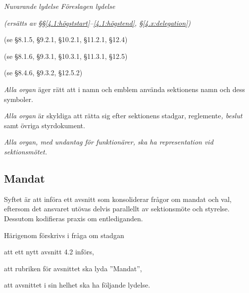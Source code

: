 \documentclass{article}
\newenvironment{lydelse}
    {\begin{paracol}{2}%
        \emph{Nuvarande lydelse}%
        \switchcolumn%
        \emph{Föreslagen lydelse}%
    \end{paracol}%
    \begin{enumerate}[label=\thesubsection.\arabic*]%
    \begin{paracol}{2}%
    }{\end{paracol}\end{enumerate}}
\begin{document}
\begin{lydelse}
	\switchcolumn
	  \emph{(ersätts av \S\S \ref{4.1:högststart}--\ref{4.1:högstend}, \S\ref{4.x:delegation})}
    
	\switchcolumn*
    \item[] (se \S 8.1.5, \S 9.2.1, \S 10.2.1, \S 11.2.1, \S 12.4)

    \item[] (se \S 8.1.6, \S 9.3.1, \S 10.3.1, \S 11.3.1, \S 12.5)

    \item[] (se \S 8.4.6, \S 9.3.2, \S 12.5.2)

  \switchcolumn
    \item \emph{Alla organ} äger rätt att i namn och emblem använda sektionens namn och dess symboler.
      \label{4.1:emblem}

    \item \emph{Alla organ} är skyldiga att rätta sig efter sektionens stadgar, reglemente\emph{, beslut} samt övriga styrdokument.
      \label{4.1:rätta}
      
    \item \emph{Alla organ, med undantag för funktionärer, ska ha representation vid sektionsmötet.} \label{4.1:rep}
\end{lydelse}

\subsection{Mandat}
Syftet är att införa ett avsnitt som konsoliderar frågor om mandat och val, eftersom det ansvaret utövas delvis parallellt av sektionsmöte och styrelse.
Dessutom kodifieras praxis om entlediganden.

Härigenom förskrivs i fråga om stadgan
\begin{dels}
    \item att ett nytt avsnitt 4.2 införs,
    \item att rubriken för avsnittet ska lyda ''Mandat'',
    \item att avsnittet i sin helhet ska ha följande lydelse.
\end{dels}
\end{document}
